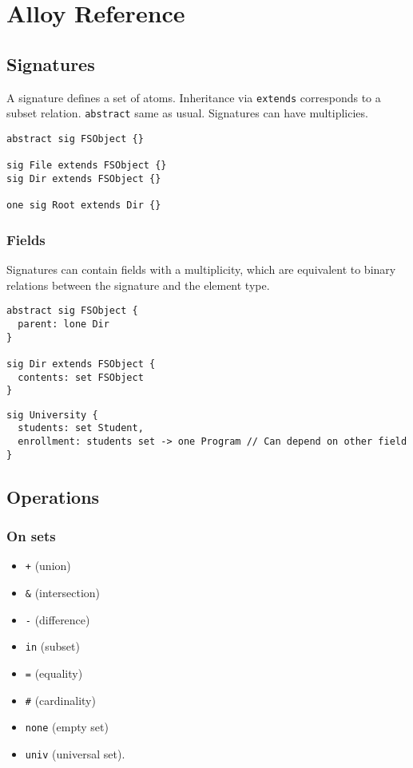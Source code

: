 \documentclass[11pt]{article}
\author{Silvan Mosberger}
\date{\today}
\title{}
\begin{document}
\tableofcontents

\section{Alloy Reference}
\label{sec:orgb0f67f0}

\subsection{Signatures}
\label{sec:org964701e}

A signature defines a set of atoms. Inheritance via \texttt{extends} corresponds to a subset relation. \texttt{abstract} same as usual. Signatures can have multiplicies.

\begin{verbatim}
abstract sig FSObject {}

sig File extends FSObject {}
sig Dir extends FSObject {}

one sig Root extends Dir {}
\end{verbatim}

\subsubsection{Fields}
\label{sec:org5e5be96}

Signatures can contain fields with a multiplicity, which are equivalent to binary relations between the signature and the element type.

\begin{verbatim}
abstract sig FSObject {
  parent: lone Dir
}

sig Dir extends FSObject {
  contents: set FSObject
}
\end{verbatim}

\begin{verbatim}
sig University {
  students: set Student,
  enrollment: students set -> one Program // Can depend on other field
}
\end{verbatim}
\subsection{Operations}
\label{sec:org196a04b}

\subsubsection{On sets}
\label{sec:org722ea51}

\begin{itemize}
\item \texttt{+} (union)
\item \texttt{\&} (intersection)
\item \texttt{-} (difference)
\item \texttt{in} (subset)
\item \texttt{=} (equality)
\item \texttt{\#} (cardinality)
\item \texttt{none} (empty set)
\item \texttt{univ} (universal set).
\end{itemize}
\end{document}
